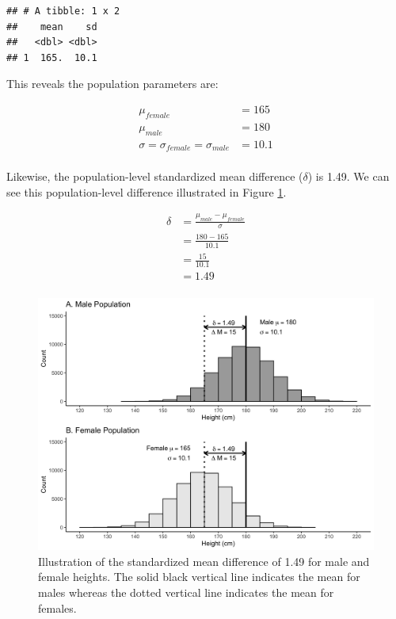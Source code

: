 \documentclass[
]{krantz}
\begin{document}
\begin{verbatim}
## # A tibble: 1 x 2
##    mean    sd
##   <dbl> <dbl>
## 1  165.  10.1
\end{verbatim}

This reveals the population parameters are:

\[
\begin{aligned} 
\mu_{female} &= 165 \\
\mu_{male} &= 180 \\
\sigma = \sigma_{female} = \sigma_{male} &= 10.1\\
\end{aligned} 
\]

Likewise, the population-level standardized mean difference (\(\delta\)) is 1.49. We can see this population-level difference illustrated in Figure \ref{fig:sexpop}.

\[
\begin{aligned} 
\delta  &= \frac{\mu_{male} - \mu_{female}}{\sigma} \\
&= \frac{180 - 165}{10.1} \\
&= \frac{15}{10.1} \\
&= 1.49 \\
\end{aligned} 
\]

\begin{figure}
\includegraphics[width=0.95\linewidth]{ch_samples/images/sex_pops} \caption[Illustration of standardized mean difference of $\delta =1.49$]{Illustration of the standardized mean difference of 1.49 for male and female heights. The solid black vertical line indicates the mean for males whereas the dotted vertical line indicates the mean for females.}\label{fig:sexpop}
\end{figure}
\end{document}

